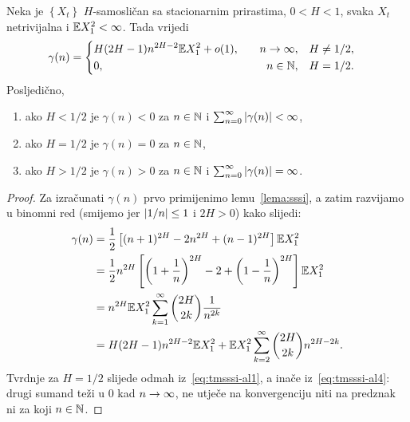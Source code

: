 \documentclass[main.tex]{subfiles}
\begin{document}
\begin{teorem} \label{tm:sssi}
	Neka je \( \left\{ X_t \right\} \) \( H \)-samosličan sa stacionarnim prirastima, \( 0 < H < 1 \),
	svaka \( X_t \) netrivijalna i \( \mathbb{E} X_1^2 < \infty \). Tada vrijedi
	\begin{equation}
		\gamma(n)=  \begin{cases}\begin{aligned}
				 & H(2H-1)n^{2H-2}\mathbb{E} X_1^2 + o(1), & \quad n \rightarrow \infty,    & \quad H\neq 1/2, \\
				 & 0,                              & \quad n \in \mathbb{N}, & \quad H=1/2.
			\end{aligned}\end{cases}
	\end{equation}
	Posljedično,
	\begin{enumerate}[label=(\roman*)]
		\item ako \( H < 1/2 \) je \( \gamma(n) < 0 \) za \( n \in \mathbb{N} \) i \( \sum_{n=0}^\infty \left| {\gamma(n)} \right| < \infty \),
		\item ako \( H=1/2 \) je \( \gamma(n)=0 \) za \( n \in \mathbb{N} \),
		\item ako \( H>1/2 \) je \( \gamma(n) > 0\) za \( n \in \mathbb{N} \) i  \( \sum_{n=0}^\infty \left| {\gamma(n)} \right| = \infty \).
	\end{enumerate}
\end{teorem}

\begin{proof}
	Za izračunati \( \gamma(n) \) prvo primijenimo lemu~\ref{lema:sssi}, a zatim
	razvijamo u binomni red (smijemo jer \( \left| {1/n} \right| \le 1 \) i \( 2H > 0 \)) kako slijedi:
	\begin{align}
		\gamma(n) & = \frac 12 \left[ (n+1)^{2H} - 2n^{2H} + (n-1)^{2H} \right] \mathbb{E} X_1^2                                          \label{eq:tmsssi-al1} \\
		          & = \frac 12 n^{2H} \left[ \left( 1+\frac 1n \right)^{2H} - 2 + \left( 1-\frac 1n \right)^{2H} \right] \mathbb{E} X_1^2                       \\
		          & = n^{2H} \mathbb{E} X_1^2 \sum_{k=1}^\infty \binom{2H}{2k} \frac 1{n^{2k}}                                                                  \\
		          & = H(2H-1)n^{2H-2}\mathbb{E} X_1^2 + \mathbb{E} X_1^2 \sum_{k=2}^\infty \binom{2H}{2k}n^{2H-2k}.\label{eq:tmsssi-al4}
	\end{align}
	Tvrdnje za \( H=1/2 \) slijede odmah iz~\eqref{eq:tmsssi-al1}, a inače iz~\eqref{eq:tmsssi-al4}: drugi sumand teži u \( 0 \) kad \( n \rightarrow \infty \), ne utječe na konvergenciju niti na
	predznak ni za koji \( n \in \mathbb{N} \).
\end{proof}
\end{document}
